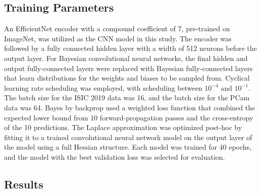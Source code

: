 \subsection{Training Parameters}
An EfficientNet encoder with a compound coefficient of 7, pre-trained on ImageNet, was utilized as the CNN model in this study. The encoder was followed by a fully connected hidden layer with a width of 512 neurons before the output layer. For Bayesian convolutional neural networks, the final hidden and output fully-connected layers were replaced with Bayesian fully-connected layers that learn distributions for the weights and biases to be sampled from. Cyclical learning rate scheduling was employed, with scheduling between $10^{-4}$ and $10^{-1}$. The batch size for the ISIC 2019 data was 16, and the batch size for the PCam data was 64. Bayes by backprop used a weighted loss function that combined the expected lower bound from 10 forward-propagation passes and the cross-entropy of the 10 predictions. The Laplace approximation was optimized post-hoc by fitting it to a trained convolutional neural network model on the output layer of the model using a full Hessian structure. Each model was trained for 40 epochs, and the model with the best validation loss was selected for evaluation.


\subsection{Results}
\label{subsec:calibration_results}

